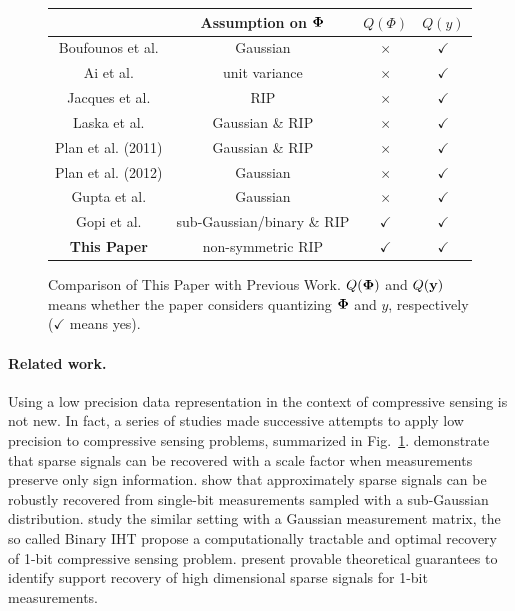 \documentclass{article}
\begin{document}
\begin{figure}[t]
\small
\centering
\begin{tabular}{c|c|cc}
\hline
                   & Assumption on ${\bf \Phi}$ & $Q(\Phi)$ & $Q(y)$ \\
\hline
 Boufounos et al.
 & Gaussian  &$\times$ & $\checkmark$\\
 Ai et al.         & unit variance &$\times$ & $\checkmark$\\
 Jacques et al.     &  RIP & $\times$& $\checkmark$\\
 Laska et al.     & Gaussian \& RIP &$\times$ & $\checkmark$\\
 Plan et al. (2011)     & Gaussian \& RIP &$\times$ & $\checkmark$\\
 Plan et al. (2012)      & Gaussian &$\times$ & $\checkmark$\\
 Gupta et al.     & Gaussian &$\times$ & $\checkmark$\\
 Gopi et al.       & sub-Gaussian/binary \& RIP &$\checkmark$ & $\checkmark$\\
\hline
  {\bf This Paper}                & non-symmetric RIP & $\checkmark$ & $\checkmark$ \\
\hline
\end{tabular}
\caption{Comparison of This Paper with Previous Work. $Q({\bf \Phi})$ and $Q({\bf y})$ means whether
the paper considers quantizing ${\bf \Phi}$ and $y$,
respectively ($\checkmark$ means yes).}
\label{tab:cs}
\end{figure}
\paragraph{Related work.}\label{section_related_work}
Using a low precision data representation in the context of compressive sensing
is not new. In fact, a series of studies made successive attempts to apply low precision  
to compressive sensing problems, summarized in
Fig.~\ref{tab:cs}. \cite{boufounos20091bitcs} demonstrate that sparse signals can be recovered with a scale factor when measurements preserve only sign information. \cite{ai20121bitcs, davenport20121bit} show that approximately sparse signals can be robustly recovered from single-bit measurements sampled with a sub-Gaussian distribution. \cite{jacques20111bit, laska20111bitcs} study the similar setting with a Gaussian measurement matrix, the so called Binary IHT \cite{plan20111bitcs, plan20121bitcs} propose a computationally tractable and optimal recovery of 1-bit compressive sensing problem. \cite{recht20121bitcs, gopi20131bitcs} present provable theoretical guarantees to identify support recovery of high dimensional sparse signals for 1-bit measurements. 
\end{document}
